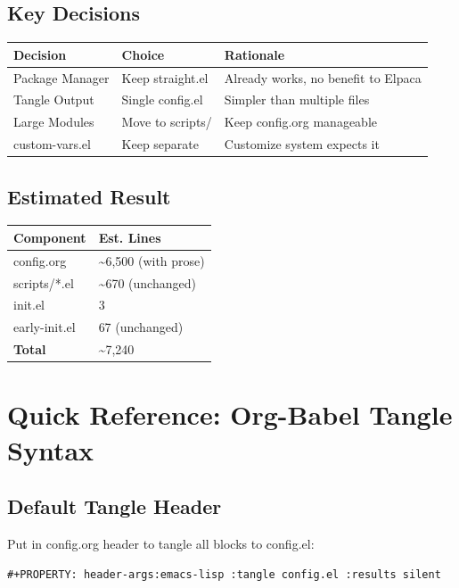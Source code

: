\documentclass[11pt]{article}
\begin{document}
\subsection{Key Decisions}
\label{sec:org7805b20}

\begin{center}
\begin{tabular}{lll}
Decision & Choice & Rationale\\
\hline
Package Manager & Keep straight.el & Already works, no benefit to Elpaca\\
Tangle Output & Single config.el & Simpler than multiple files\\
Large Modules & Move to scripts/ & Keep config.org manageable\\
custom-vars.el & Keep separate & Customize system expects it\\
\end{tabular}
\end{center}
\subsection{Estimated Result}
\label{sec:orgd5ed24d}

\begin{center}
\begin{tabular}{ll}
Component & Est. Lines\\
\hline
config.org & \textasciitilde{}6,500 (with prose)\\
scripts/*.el & \textasciitilde{}670 (unchanged)\\
init.el & 3\\
early-init.el & 67 (unchanged)\\
\textbf{Total} & \textasciitilde{}7,240\\
\end{tabular}
\end{center}
\section{Quick Reference: Org-Babel Tangle Syntax}
\label{sec:orgd03293d}

\subsection{Default Tangle Header}
\label{sec:org121a1dc}

Put in config.org header to tangle all blocks to config.el:

\begin{verbatim}
#+PROPERTY: header-args:emacs-lisp :tangle config.el :results silent
\end{verbatim}
\end{document}
